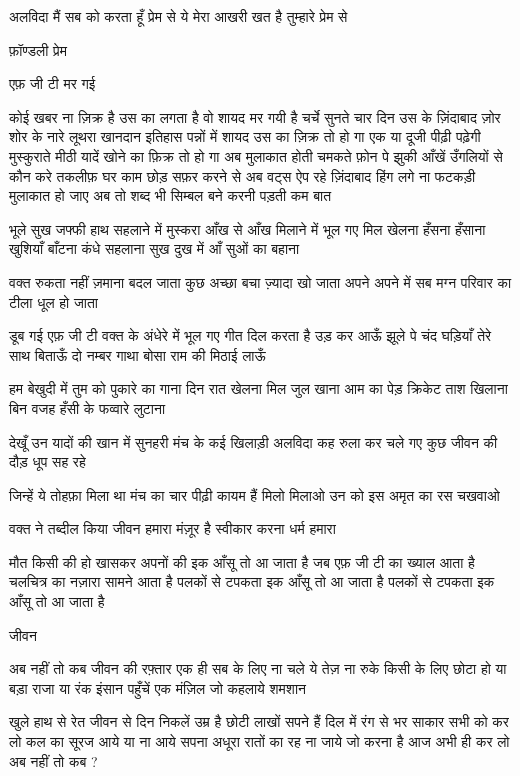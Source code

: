 अलविदा मैं सब को करता हूँ प्रेम से
ये मेरा आखरी खत है तुम्हारे प्रेम से

फ़ॉण्डली प्रेम

एफ़ जी टी मर गई

कोई खबर ना ज़िक्र है उस का
लगता है वो शायद मर गयी है
चर्चे सुनते चार दिन उस के
ज़िंदाबाद ज़ोर शोर के नारे
लूथरा खानदान इतिहास पन्नों में
शायद उस का ज़िक्र तो हो गा
एक या दूजी पीढ़ी पढ़ेगी मुस्कुराते
मीठी यादें खोने का फ़िक्र तो हो गा
अब मुलाकात होती चमकते फ़ोन पे
झुकी आँखें उँगलियों से
कौन करे तकलीफ़
घर काम छोड़ सफ़र करने से
अब वट्स ऐप रहे ज़िंदाबाद
हिंग लगे ना फटकड़ी
मुलाकात हो जाए
अब तो शब्द भी सिम्बल बने 
करनी पड़ती कम बात 

भूले सुख जफ्फी हाथ सहलाने में
मुस्करा आँख से आँख मिलाने में
भूल गए मिल खेलना हँसना हँसाना
खुशियाँ बाँटना कंधे सहलाना
सुख दुख में आँ सुओं का बहाना
 
वक्त रुकता नहीं ज़माना बदल जाता 
कुछ अच्छा बचा ज़्यादा खो जाता
अपने अपने में सब मग्न
परिवार का टीला धूल हो जाता

डूब गई एफ़ जी टी वक्त के अंधेरे में
भूल गए गीत दिल करता है उड़ कर आऊँ
झूले पे चंद घड़ियाँ तेरे साथ बिताऊँ
दो नम्बर गाथा बोसा राम की मिठाई लाऊँ

हम बेखुदी में तुम को पुकारे का गाना
दिन रात खेलना मिल जुल खाना
आम का पेड़ क्रिकेट ताश खिलाना
बिन वजह हँसी के फव्वारे लुटाना

देखूँ उन यादों की खान में
सुनहरी मंच के कई खिलाड़ी
अलविदा कह रुला कर चले गए
कुछ जीवन की दौड़ धूप सह रहे

जिन्हें ये तोहफ़ा मिला था मंच का
चार पीढ़ी कायम हैं मिलो मिलाओ
उन को इस अमृत का रस चखवाओ



वक्त ने तब्दील किया जीवन हमारा
मंज़ूर है स्वीकार करना धर्म हमारा

मौत किसी की हो खासकर अपनों की
इक आँसू तो आ जाता है
जब एफ़ जी टी का ख्याल आता है
चलचित्र का नज़ारा सामने आता है
पलकों से टपकता इक आँसू तो आ जाता है
पलकों से टपकता इक आँसू तो आ जाता है











जीवन

अब नहीं तो कब
जीवन की रफ़्तार एक ही सब के लिए
ना चले ये तेज़ ना रुके किसी के लिए
छोटा हो या बड़ा राजा या रंक इंसान
पहुँचें एक मंज़िल जो कहलाये शमशान






खुले हाथ से रेत जीवन से दिन निकलें
उम्र है छोटी लाखों सपने हैं दिल में
रंग से भर साकार सभी को कर लो
कल का सूरज आये या ना आये
सपना अधूरा रातों का रह ना जाये
जो करना है आज अभी ही कर लो
अब नहीं तो कब ?




